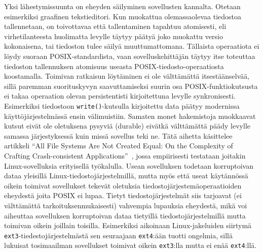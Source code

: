 \documentclass[a4paper]{article}
\begin{document}
Yksi lähestymissuunta on eheyden säilyminen sovellusten kannalta.
Otetaan esimerkiksi graafinen tekstieditori.
Kun muokattua olemassaolevaa tiedostoa tallennetaan,
on toivottavaa että tallentaminen tapahtuu atomisesti,
eli virhetilanteesta huolimatta levylle täytyy päätyä joko muokattu versio kokonaisena,
tai tiedoston tulee säilyä muuttumattomana.
Tällaista operaatiota ei löydy suoraan POSIX-standardista,
vaan sovelluskehittäjän täytyy itse toteuttaa tiedoston tallennuksen atomisuus useasta POSIX-tiedosto-operaatiosta koostamalla.
Toimivan ratkaisun löytäminen ei ole välttämättä itsestäänselvää,
sillä paremman suorituskyvyn saavuttamiseksi suurin osa POSIX-funktiokutsusta ei takaa operaation olevan persistentisti kirjoitettuna levylle synkronisesti.
Esimerkiksi tiedostoon \texttt{write()}-kutsulla kirjoitettu data päätyy modernissa käyttöjärjestelmässä ensin välimuistiin.
Samaten monet hakemistoja muokkaavat kutsut eivät ole oletuksena pysyviä (durable)
eivätkä välttämättä päädy levylle samassa järjestyksessä kuin missä sovellus teki ne.
Tätä aihetta käsittelee artikkeli ``All File Systems Are Not Created Equal: On the Complexity of Crafting Crash-consistent Applications''~\cite{PosixDataConsistency},
jossa empiirisesti testataan joitakin Linux-sovelluksia erityisellä työkalulla.
Usean sovelluksen todetaan korruptoivan dataa yleisillä Linux-tiedostojärjestelmillä,
mutta myös että useat käytännössä oikein toimivat sovellukset tekevät oletuksia tiedostojärjestemäoperaatioiden eheydestä joita POSIX ei lupaa.
Tietyt tiedostojärjestelmät siis tarjoavat (ei välttämättä tarkoituksenmukaisesti) vahvempia lupauksia eheydestä,
mikä voi aiheuttaa sovelluksen korruptoivan dataa tietyillä tiedostojärjestelmillä mutta toimivan oikein joillain toisilla.
Esimerkiksi aikoinaan Linux-jakeluiden siirtymä \texttt{ext3}-tiedestojärjestelmästä sen seuraajaan \texttt{ext4}:ään tuotti ongelmia,
sillä lukuisat tosimaailman sovellukset toimivat oikein \texttt{ext3}:lla mutta ei enää \texttt{ext4}:llä.
\end{document}
